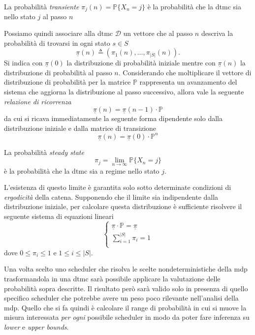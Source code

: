 \begin{mtdef}
La probabilità \emph{transiente} $\pi_j(n) = \mathbb{P}\{X_n = j\}$ è la probabilità che la \ac{dtmc} sia nello stato $j$ al passo $n$
\end{mtdef}

Possiamo quindi associare alla \ac{dtmc} $\mathcal{D}$ un vettore che al passo $n$ descriva la probabilità di trovarsi in ogni stato $s \in S$ $$\underline\pi(n) \triangleq (\pi_1(n), \dots, \pi_{|S|}(n)).$$
Si indica con $\underline\pi(0)$ la distribuzione di probabilità iniziale mentre con $\underline\pi(n)$ la distribuzione di probabilità al passo $n$.
Considerando che moltiplicare il vettore di distribuzione di probabilità per la matrice $\mathbb{P}$ rappresenta un avanzamento del sistema che aggiorna la distribuzione al passo successivo, allora vale la seguente \emph{relazione di ricorrenza}
$$ \underline\pi(n) = \underline\pi(n-1) \cdot \mathbb{P} $$
da cui si ricava immediatamente la seguente forma dipendente solo dalla  distribuzione iniziale e dalla matrice di transizione
$$ \underline\pi(n) = \underline\pi(0) \cdot \mathbb{P}^n$$

\begin{mtdef}
La probabilità \emph{steady state} $$\pi_j = \lim_{n\rightarrow\infty} \mathbb{P}\{X_n = j\}$$ è la probabilità che la \ac{dtmc} sia a regime nello stato $j$.
\end{mtdef}

L'esistenza di questo limite è garantita solo sotto determinate condizioni di \emph{ergodicità} della catena. Supponendo che il limite sia indipendente dalla distribuzione iniziale, per calcolare questa distribuzione è sufficiente risolvere il seguente sistema di equazioni lineari
$$
\left\{
\begin{array}{l}
\underline\pi \cdot \mathbb{P} = \underline\pi \\
\sum^{|S|}_{i=1} \pi_i = 1 \\
\end{array}
\right.
$$
dove $0 \leq \pi_i \leq 1$ e $1 \leq i \leq |S|$.

Una volta scelto uno scheduler che risolva le scelte nondeterministiche della \ac{mdp} trasformandola in una \ac{dtmc} sarà possibile applicare la valutazione delle probabilità sopra descritte. Il risultato però sarà valido solo in presenza di quello specifico scheduler che potrebbe avere un peso poco rilevante nell'analisi della \ac{mdp}. Quello che si fa quindi è calcolare il range di probabilità in cui si muove la misura interessata \emph{per ogni} possibile scheduler in modo da poter fare inferenza su \emph{lower} e \emph{upper bounds}.

